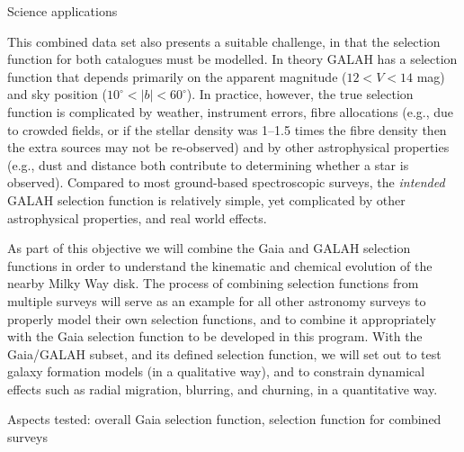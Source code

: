 \begin{workpackage}{Science applications}
\begin{wpobjectives}
\begin{description}
{        This combined data set also presents a suitable challenge, in that the selection function for both catalogues must be modelled. In theory GALAH has a selection function that depends primarily on the apparent magnitude ($12 < V <14$ mag) and sky position ($10^\circ < |b| < 60^\circ$). In practice, however, the true selection function is complicated by weather, instrument errors, fibre allocations (e.g., due to crowded fields, or if the stellar density was 1--1.5 times the fibre density then the extra sources may not be re-observed) and by other astrophysical properties (e.g., dust and distance both contribute to determining whether a star is observed). Compared to most ground-based spectroscopic surveys, the \emph{intended} GALAH selection function is relatively simple, yet complicated by other astrophysical properties, and real world effects.
      
        As part of this objective we will combine the Gaia and GALAH selection functions in order to understand the kinematic and chemical evolution of the nearby Milky Way disk. The process of combining selection functions from multiple surveys will serve as an example for all other astronomy surveys to properly model their own selection functions, and to combine it appropriately with the Gaia selection function to be developed in this program. With the Gaia/GALAH subset, and its defined selection function, we will set out to test galaxy formation models (in a qualitative way), and to constrain dynamical effects such as radial migration, blurring, and churning, in a quantitative way.
        
        \textsf{Aspects tested: overall Gaia selection function, selection function for combined surveys}
     }
    \end{description}
  \end{wpobjectives}

  \begin{wpdescription}
\end{wpdescription}
\end{workpackage}
